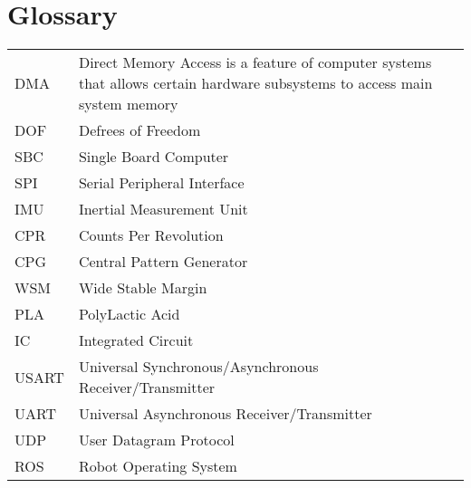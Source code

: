 \section{Glossary}
\begin{table}[H]
    
    \begin{tabular}{p{} p{}}
       DMA  & Direct Memory Access is a feature of computer systems that allows certain hardware subsystems to access main system memory  \\
       DOF & Defrees of Freedom\\
       SBC & Single Board Computer \\
       SPI & Serial Peripheral Interface\\
       IMU & Inertial Measurement Unit\\
       CPR & Counts Per Revolution \\
       CPG& Central Pattern Generator\\
       WSM & Wide Stable Margin \\
       PLA & PolyLactic Acid\\
       IC & Integrated Circuit\\
       USART & Universal Synchronous/Asynchronous Receiver/Transmitter\\
       UART & Universal Asynchronous Receiver/Transmitter\\
       UDP & User Datagram Protocol\\
       ROS & Robot Operating System \\
       
    \end{tabular}
\end{table}
